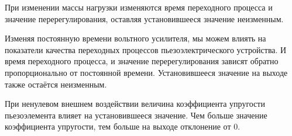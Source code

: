 \documentclass[fleqn, a4paper, 11pt, russian]{article}
\begin{document}
	При изменении массы нагрузки изменяются время переходного процесса и значение перерегулирования, оставляя установившееся значение неизменным.
	
	Изменяя постоянную времени вольтного усилителя, мы можем влиять на показатели качества переходных процессов пьезоэлектрического устройства. И время переходного процесса, и значение перерегулирования зависят обратно пропорционально от постоянной времени. Установившееся значение на выходе также остаётся неизменным.
	
	При ненулевом внешнем воздействии величина коэффициента упругости пьезоэлемента влияет на установившееся значение. Чем больше значение коэффициента упругости, тем больше на выходе отклонение от 0.
	
\end{document}
